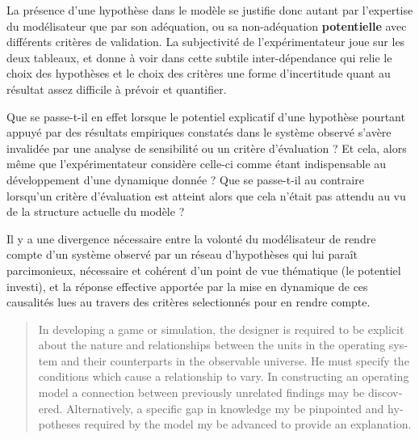 
La présence d'une hypothèse dans le modèle se justifie donc autant par l'expertise du modélisateur que par son adéquation, ou sa non-adéquation \textbf{potentielle} avec différents critères de validation. La subjectivité de l'expérimentateur joue sur les deux tableaux, et donne à voir dans cette subtile inter-dépendance qui relie le choix des hypothèses et le choix des critères une forme d'incertitude quant au résultat assez difficile à prévoir et quantifier.

Que se passe-t-il en effet lorsque le potentiel explicatif d'une hypothèse pourtant appuyé par des résultats empiriques constatés dans le système observé s'avère invalidée par une analyse de sensibilité ou un critère d'évaluation ? Et cela, alors même que l'expérimentateur considère celle-ci comme étant indispensable au développement d'une dynamique donnée ? Que se passe-t-il au contraire lorsqu'un critère d'évaluation est atteint alors que cela n'était pas attendu au vu de la structure actuelle du modèle ?


Il y a une divergence nécessaire entre la volonté du modélisateur de rendre compte d'un système observé par un réseau d'hypothèses qui lui paraît parcimonieux, nécessaire et cohérent d'un point de vue thématique (le potentiel investi), et la réponse effective apportée par la mise en dynamique de ces causalités lues au travers des critères selectionnés pour en rendre compte. %

\foreignblockquote{english}[{\cite[219]{Hermann1967}}]{In developing a game or simulation, the designer is required to be explicit about the nature and relationships between the units in the operating system and their counterparts in the observable universe. He must specify the conditions which cause a relationship to vary. In constructing an operating model a connection between previously unrelated findings may be discovered. Alternatively, a specific gap in knowledge my be pinpointed and hypotheses required by the model my be advanced to provide an explanation.}

